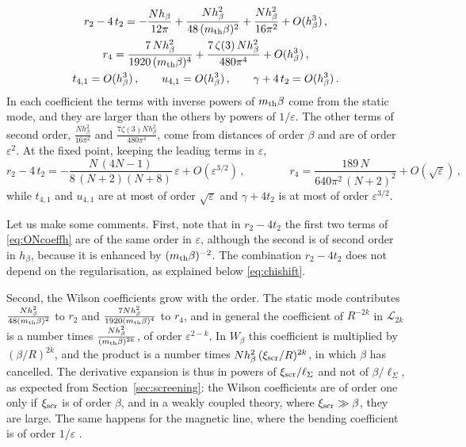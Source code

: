 \documentclass[a4paper,11pt]{article}
\newcommand{\xiscr}{\xi_{\rm scr}}
\begin{document}
\begin{equation}\label{eq:ONcoeffh}
	\begin{gathered}
		r_2-4\,t_2=-\frac{N h_\beta}{12\pi}+\frac{N h_\beta^2}{48\,(m_{\rm th}\beta)^2}+\frac{N h_\beta^2}{16\pi^2}+O(h_\beta^3)\, ,\\
		r_4=\frac{7\,N h_\beta^2}{1920\,(m_{\rm th}\beta)^4}+\frac{7\,\zeta(3)\,N h_\beta^2}{480\pi^4}+O(h_\beta^3)\, ,\\
		t_{4,1}=O(h_\beta^3)\, ,\qquad u_{4,1}=O(h_\beta^3)\, ,\qquad \gamma+4\,t_2=O(h_\beta^3)\, .
	\end{gathered}
\end{equation}
In each coefficient the terms with inverse powers of $m_{\rm th}\beta$ come from the static mode, and they are larger than the others by powers of $1/\varepsilon$. The other terms of second order, $\tfrac{N h_\beta^2}{16\pi^2}$ and $\tfrac{7\zeta(3)N h_\beta^2}{480\pi^4}$, come from distances of order $\beta$ and are of order $\varepsilon^2$. At the fixed point, keeping the leading terms in $\varepsilon$,
\begin{equation}\label{eq:ONcoeff}
	r_2-4\,t_2=-\frac{N\,(4N-1)}{8\,(N+2)(N+8)}\,\varepsilon+O(\varepsilon^{3/2})\, ,\qquad\qquad
	r_4=\frac{189\,N}{640\pi^2\,(N+2)^2}+O(\sqrt\varepsilon)\,,
\end{equation}
while $t_{4,1}$ and $u_{4,1}$ are at most of order $\sqrt\varepsilon$ and $\gamma+4t_2$ is at most of order $\varepsilon^{3/2}$.


Let us make some comments. First, note that in $r_2-4t_2$ the first two terms of \eqref{eq:ONcoeffh} are of the same order in $\varepsilon$, although the second is of second order in $h_\beta$, because it is enhanced by $(m_{\rm th}\beta)^{-2}$. The combination $r_2-4t_2$ does not depend on the regularisation, as explained below \eqref{eq:chishift}.

Second, the Wilson coefficients grow with the order. The static mode contributes $\tfrac{N h_\beta^2}{48(m_{\rm th}\beta)^2}$ to $r_2$ and $\tfrac{7N h_\beta^2}{1920(m_{\rm th}\beta)^4}$ to $r_4$, and in general the coefficient of $R^{-2k}$ in $\mathcal{L}_{2k}$ is a number times $\tfrac{N h_\beta^2}{(m_{\rm th}\beta)^{2k}}$, of order $\varepsilon^{2-k}$. In $W_\beta$ this coefficient is multiplied by $(\beta/R)^{2k}$, and the product is a number times $N h_\beta^2\,(\xiscr/R)^{2k}$, in which $\beta$ has cancelled. The derivative expansion is thus in powers of $\xiscr/\ell_\Sigma$ and not of $\beta/\ell_\Sigma$, as expected from Section~\ref{sec:screening}: the Wilson coefficients are of order one only if $\xiscr$ is of order $\beta$, and in a weakly coupled theory, where $\xiscr\gg\beta$, they are large. The same happens for the magnetic line, where the bending coefficient is of order $1/\varepsilon$ \cite{BMP}.
\end{document}

